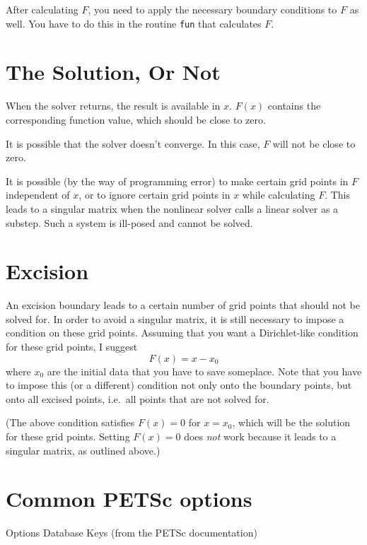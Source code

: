 \documentclass[12pt]{article}
\begin{document}
After calculating $F$, you need to apply the necessary boundary
conditions to $F$ as well.  You have to do this in the routine
\texttt{fun} that calculates $F$.

\section{The Solution, Or Not}

When the solver returns, the result is available in $x$.  $F(x)$
contains the corresponding function value, which should be close to
zero.

It is possible that the solver doesn't converge.  In this case, $F$
will not be close to zero.

It is possible (by the way of programming error) to make certain grid
points in $F$ independent of $x$, or to ignore certain grid points in
$x$ while calculating $F$.  This leads to a singular matrix when the
nonlinear solver calls a linear solver as a substep.  Such a system is
ill-posed and cannot be solved.

\section{Excision}

An excision boundary leads to a certain number of grid points that
should not be solved for.  In order to avoid a singular matrix, it is
still necessary to impose a condition on these grid points.  Assuming
that you want a Dirichlet-like condition for these grid points, I
suggest
$$
F(x) = x - x_0
$$
where $x_0$ are the initial data that you have to save someplace.
Note that you have to impose this (or a different) condition not only
onto the boundary points, but onto all excised points, i.e.\ all
points that are not solved for.

(The above condition satisfies $F(x)=0$ for $x=x_0$, which will be the
solution for these grid points.  Setting $F(x)=0$ does \emph{not} work
because it leads to a singular matrix, as outlined above.)

\section{Common PETSc options}

Options Database Keys (from the PETSc documentation)
\end{document}
